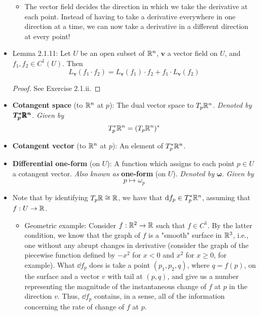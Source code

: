 \documentclass[../notes.tex]{subfiles}
\begin{document}
\begin{itemize}
\begin{itemize}
\begin{equation*}
        \end{equation*}
        \item The vector field decides the direction in which we take the derivative at each point. Instead of having to take a derivative everywhere in one direction at a time, we can now take a derivative in a different direction at every point!
    \end{itemize}
    \item Lemma 2.1.11: Let $U$ be an open subset of $\mathbb{R}^n$, $\bm{v}$ a vector field on $U$, and $f_1,f_2\in C^1(U)$. Then
    \begin{equation*}
        L_{\bm{v}}(f_1\cdot f_2) = L_{\bm{v}}(f_1)\cdot f_2+f_1\cdot L_{\bm{v}}(f_2)
    \end{equation*}
    \begin{proof}
        See Exercise 2.1.ii.
    \end{proof}
    \item \textbf{Cotangent space} (to $\mathbb{R}^n$ at $p$): The dual vector space to $T_p\mathbb{R}^n$. \emph{Denoted by} $\bm{T_p^*\pmb{\mathbb{R}}^n}$. \emph{Given by}
    \begin{equation*}
        T_p^*\mathbb{R}^n = (T_p\mathbb{R}^n)^*
    \end{equation*}
    \item \textbf{Cotangent vector} (to $\mathbb{R}^n$ at $p$): An element of $T_p^*\mathbb{R}^n$.
    \item \textbf{Differential one-form} (on $U$): A function which assigns to each point $p\in U$ a cotangent vector. \emph{Also known as} \textbf{one-form} (on $U$). \emph{Denoted by} $\bm{\omega}$. \emph{Given by}
    \begin{equation*}
        p \mapsto \omega_p
    \end{equation*}
    \item Note that by identifying $T_p\mathbb{R}\cong\mathbb{R}$, we have that $\dd f_p\in T_p^*\mathbb{R}^n$, assuming that $f:U\to\mathbb{R}$.
    \begin{itemize}
        \item Geometric example: Consider $f:\mathbb{R}^2\to\mathbb{R}$ such that $f\in C^1$. By the latter condition, we know that the graph of $f$ is a "smooth" surface in $\mathbb{R}^3$, i.e., one without any abrupt changes in derivative (consider the graph of the piecewise function defined by $-x^2$ for $x<0$ and $x^2$ for $x\geq 0$, for example). What $\dd f_p$ does is take a point $(p_1,p_2,q)$, where $q=f(p)$, on the surface and a vector $v$ with tail at $(p,q)$, and give us a number representing the magnitude of the instantaneous change of $f$ at $p$ in the direction $v$. Thus, $\dd f_p$ contains, in a sense, all of the information concerning the rate of change of $f$ at $p$.

\end{itemize}
\end{itemize}
\end{document}
